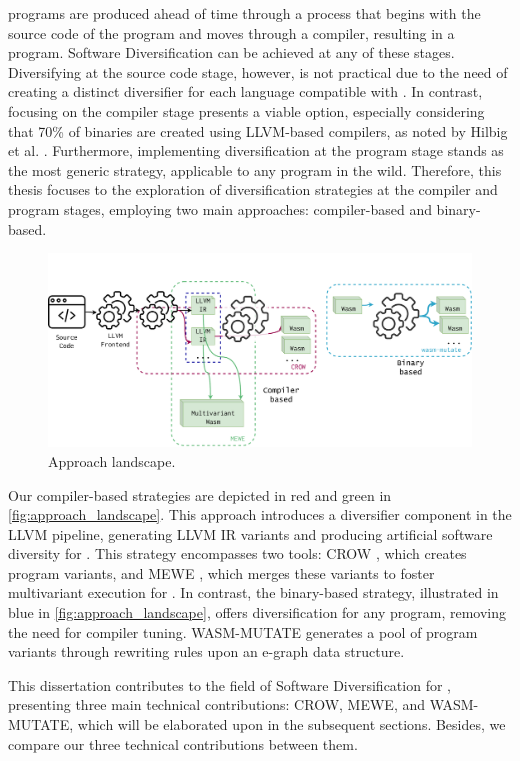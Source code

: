 


\Wasm programs are produced ahead of time through a process that begins with the source code of the program and moves through a compiler, resulting in a \Wasm program. 
Software Diversification can be achieved at any of these stages. 
Diversifying at the source code stage, however, is not practical due to the need of creating a distinct diversifier for each language compatible with \Wasm. 
In contrast, focusing on the compiler stage presents a viable option, especially considering that 70\% of \Wasm binaries are created using LLVM-based compilers, as noted by Hilbig et al. \cite{Hilbig2021AnES}. 
Furthermore, implementing diversification at the \Wasm program stage stands as the most generic strategy, applicable to any \Wasm program in the wild. 
Therefore, this thesis focuses to the exploration of diversification strategies at the compiler and \Wasm program stages, employing two main approaches: compiler-based and binary-based.


\begin{figure}[h]
	\centering
	\includegraphics[width=1.1\textwidth]{figures/landscape.pdf}
	\caption{Approach landscape.}
	\label{fig:approach_landscape}
\end{figure}

Our compiler-based strategies are depicted in red and green in \autoref{fig:approach_landscape}. 
This approach introduces a diversifier component in the LLVM pipeline, generating LLVM IR variants and producing artificial software diversity for \wasm. 
This strategy encompasses two tools: CROW \cite{CROW}, which creates \wasm program variants, and MEWE \cite{MEWE}, which merges these variants to foster multivariant execution for \wasm.
In contrast, the binary-based strategy, illustrated in blue in \autoref{fig:approach_landscape}, offers diversification for any \Wasm program, removing the need for compiler tuning. 
WASM-MUTATE \cite{wasmmutate} generates a pool of \Wasm program variants through rewriting rules upon an e-graph \cite{e-graph} data structure.


This dissertation contributes to the field of Software Diversification for \Wasm, presenting three main technical contributions: CROW, MEWE, and WASM-MUTATE, which will be elaborated upon in the subsequent sections.
Besides, we compare our three technical contributions between them.

